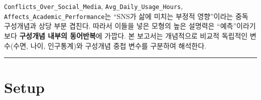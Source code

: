 \documentclass[11pt]{article}
\begin{document}
\texttt{Conflicts\_Over\_Social\_Media},
\texttt{Avg\_Daily\_Usage\_Hours},
\texttt{Affects\_Academic\_Performance}는 ``SNS가 삶에 미치는 부정적
영향''이라는 중독 구성개념과 상당 부분 겹친다. 따라서 이들을 넣은 모형의
높은 설명력은 ``예측''이라기보다 \textbf{구성개념 내부의 동어반복}에
가깝다. 본 보고서는 개념적으로 비교적 독립적인 변수(수면, 나이,
인구통계)와 구성개념 중첩 변수를 구분하여 해석한다.

    \begin{center}\rule{0.5\linewidth}{0.5pt}\end{center}

\hypertarget{setup}{%
\section{Setup}\label{setup}}
\end{document}
